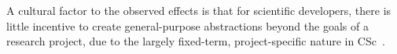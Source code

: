 \documentclass[conference,10pt]{IEEEtran}
\begin{document}
A cultural factor to the observed effects is that for scientific developers, there is little incentive to create general-purpose abstractions beyond the goals of a research project, due to the largely fixed-term, project-specific nature in CSc~\cite{johan18_secs}.
















\end{document}
